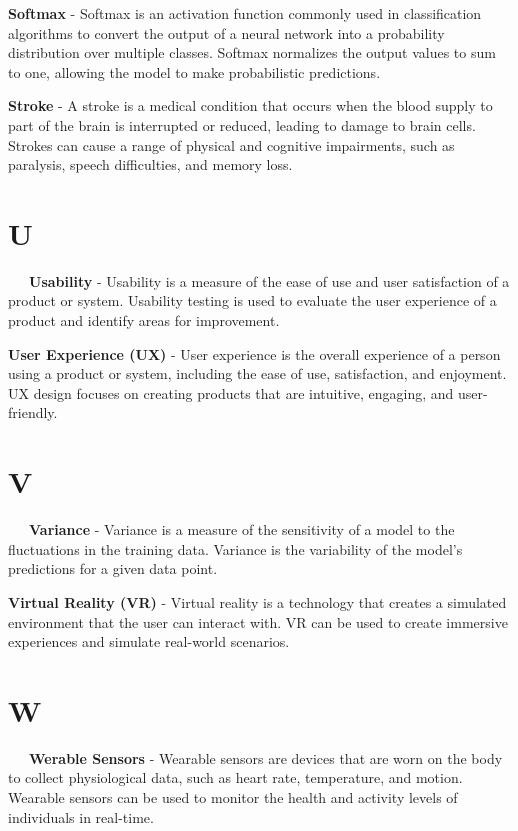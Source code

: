\textbf{Softmax} - Softmax is an activation function commonly used in classification algorithms to convert the output of a neural network into a probability distribution over multiple classes. Softmax normalizes the output values to sum to one, allowing the model to make probabilistic predictions.

\textbf{Stroke} - A stroke is a medical condition that occurs when the blood supply to part of the brain is interrupted or reduced, leading to damage to brain cells. Strokes can cause a range of physical and cognitive impairments, such as paralysis, speech difficulties, and memory loss.

\section*{U}

\-\ \-\ \-\ \textbf{Usability} - Usability is a measure of the ease of use and user satisfaction of a product or system. Usability testing is used to evaluate the user experience of a product and identify areas for improvement.

\textbf{User Experience (UX)} - User experience is the overall experience of a person using a product or system, including the ease of use, satisfaction, and enjoyment. UX design focuses on creating products that are intuitive, engaging, and user-friendly.

\section*{V}

\-\ \-\ \-\ \textbf{Variance} - Variance is a measure of the sensitivity of a model to the fluctuations in the training data. Variance is the variability of the model's predictions for a given data point.

\textbf{Virtual Reality (VR)} - Virtual reality is a technology that creates a simulated environment that the user can interact with. VR can be used to create immersive experiences and simulate real-world scenarios.

\section*{W}

\-\ \-\ \-\ \textbf{Werable Sensors} - Wearable sensors are devices that are worn on the body to collect physiological data, such as heart rate, temperature, and motion. Wearable sensors can be used to monitor the health and activity levels of individuals in real-time.
